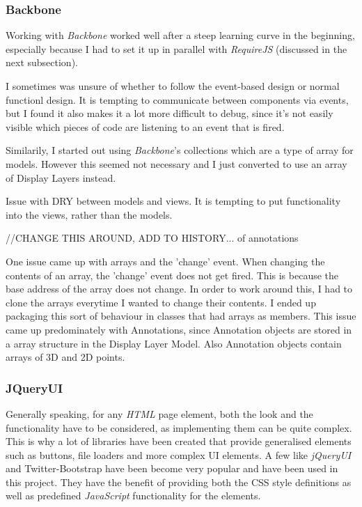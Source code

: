 \documentclass[a4paper,11pt,twoside]{article}
\begin{document}
\subsubsection{Backbone}

Working with \textit{Backbone} worked well after a steep learning curve in the beginning, especially because I had to set it up in parallel with \textit{RequireJS} (discussed in the next subsection).

I sometimes was unsure of whether to follow the event-based design or normal functionl design. It is tempting to communicate between components via events, but I found it also makes it a lot more difficult to debug, since it's not easily visible which pieces of code are listening to an event that is fired.

Similarily, I started out using \textit{Backbone}'s collections which are a type of array for models. However this seemed not necessary and I just converted to use an array of Display Layers instead.

Issue with DRY between models and views. It is tempting to put functionality into the views, rather than the models.

//CHANGE THIS AROUND, ADD TO HISTORY... of annotations

One issue came up with arrays and the 'change' event. When changing the contents of an array, the 'change' event does not get fired. This is because the base address of the array does not change. In order to work around this, I had to clone the arrays everytime I wanted to change their contents. I ended up packaging this sort of behaviour in classes that had arrays as members. This issue came up predominately with Annotations, since Annotation objects are stored in a array structure in the Display Layer Model. Also Annotation objects contain arrays of 3D and 2D points.






\subsubsection{JQueryUI}

Generally speaking, for any \textit{HTML} page element, both the look and the functionality have to be considered, as implementing them can be quite complex. This is why a lot of libraries have been created that provide generalised elements such as buttons, file loaders and more complex UI elements. A few like \textit{jQueryUI} and Twitter-Bootstrap have been become very popular and have been used in this project. They have the benefit of providing both the CSS style definitions as well as predefined \textit{JavaScript} functionality for the elements. 
\end{document}
